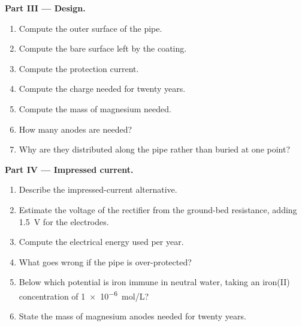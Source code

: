 \begin{problem}
\medskip
\noindent\textbf{Part III --- Design.}
\begin{enumerate}[resume]
  \item Compute the outer surface of the pipe.
  \item Compute the bare surface left by the coating.
  \item Compute the protection current.
  \item Compute the charge needed for twenty years.
  \item Compute the mass of magnesium needed.
  \item How many anodes are needed?
  \item Why are they distributed along the pipe rather than buried at one
        point?
\end{enumerate}

\medskip
\noindent\textbf{Part IV --- Impressed current.}
\begin{enumerate}[resume]
  \item Describe the impressed-current alternative.
  \item Estimate the voltage of the rectifier from the ground-bed resistance,
        adding \qty{1.5}{V} for the electrodes.
  \item Compute the electrical energy used per year.
  \item What goes wrong if the pipe is over-protected?
  \item Below which potential is iron immune in neutral water, taking an
        iron(II) concentration of \qty{1e-6}{mol/L}?
  \item State the mass of magnesium anodes needed for twenty years.
\end{enumerate}
\end{problem}
